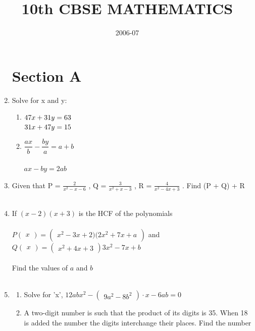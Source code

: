 \documentclass[journal,12pt,twocolumn]{IEEEtran}
\title{10th CBSE MATHEMATICS}
\author{2006-07}
\newcommand{\myvec}[1]{\ensuremath{\begin{pmatrix}#1\end{pmatrix}}}
\begin{document}
\begin{enumerate}[label=1.\arabic*]
\maketitle
\section{Section A}
\item Solve for x and y: \\
\begin{enumerate}
    \item $47x + 31y = 63\\$\\
    $31x + 47y = 15\\$\\
    \item $\dfrac{ax}{b}  - \dfrac{by}{a}  = a+b$\\
    \vspace{1mm}\\
    $ ax - by = 2ab $\\
\end{enumerate}
\item Given that P = $ \frac{2}{x^2 - x - 6}$ , Q = $ \frac{3}{x^2 + x - 3 }$ , R = $ \frac{4}{x^2 - 4x + 3}$ 
. Find (P + Q) + R\\
\vspace{5mm}\\
\item If $ (x-2)(x+3) $ is the HCF of the polynomials\\
\vspace{2mm}\\
$ P\myvec{x} = \myvec{x^2 - 3x + 2)(2x^2 + 7x + a}$  and\\
$ Q\myvec{x} = \myvec{x^2 + 4x + 3}{3x^2 - 7x + b}$\\
\vspace{2mm}\\
Find the values of $a$ and $b$\\
\vspace{5mm}\\
\item
\begin{enumerate}
    \item Solve for 'x', $ 12abx^2 - \myvec{9a^2 - 8b^2} \cdot x - 6ab = 0 $\\
    \item A two-digit number is such that the product of its digits is 35. When 18 is added the number the digits interchange their places. Find the number\\
\end{enumerate}



\end{enumerate}
\end{document}
